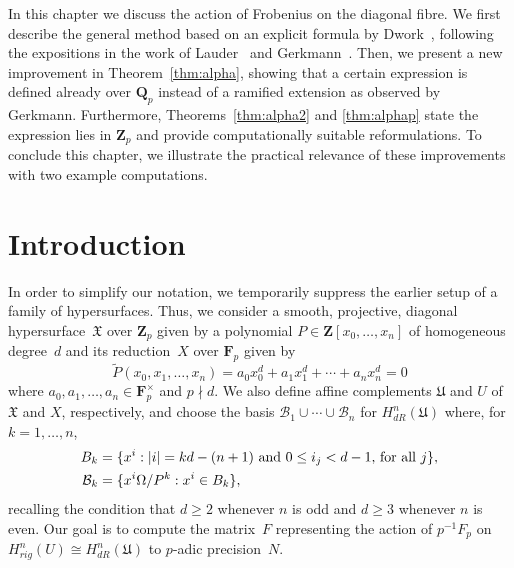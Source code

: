 
In this chapter we discuss the action of Frobenius on the diagonal fibre. 
We first describe the general method based on an explicit formula by 
Dwork~\citep[\S 4]{Dwork64}, following the expositions in the work of 
Lauder~\citep[\S 6]{Lau04} and Gerkmann~\citep[\S 4.4]{Gerkmann2007}.  Then, 
we present a new improvement in Theorem~\ref{thm:alpha}, showing that a 
certain expression is defined already over $\mathbf{Q}_p$ instead of a ramified
extension as observed by Gerkmann.  Furthermore, Theorems~\ref{thm:alpha2} 
and \ref{thm:alphap} state the expression lies in $\mathbf{Z}_p$ and 
provide computationally suitable reformulations.  To conclude this chapter, 
we illustrate the practical relevance of these improvements with two example 
computations.


\section{Introduction}

In order to simplify our notation, we temporarily suppress the earlier 
setup of a family of hypersurfaces.
Thus, we consider a smooth, projective, diagonal hypersurface~$\mathfrak{X}$ 
over $\mathbf{Z}_p$ given by a polynomial $P \in \mathbf{Z}[x_0, \dotsc, x_n]$ 
of homogeneous degree~$d$ and its reduction~$X$ over $\mathbf{F}_p$ given by 
\begin{equation*}
\tilde{P}(x_0, x_1, \dotsc, x_n) = 
    a_0 x_0^d + a_1 x_1^d + \dotsb + a_n x_n^d = 0
\end{equation*}
where $a_0, a_1, \dotsc, a_n \in \mathbf{F}_p^{\times}$ and $p \nmid d$.  
We also define affine complements $\mathfrak{U}$ and $U$ of $\mathfrak{X}$ 
and $X$, respectively, and choose the basis 
$\mathcal{B}_1 \cup \dotsb \cup \mathcal{B}_n$ for $H_{dR}^n(\mathfrak{U})$ 
where, for $k = 1, \dotsc, n$, 
\begin{align*}
B_k & = \{ x^i : \text{$\lvert i\rvert = kd - (n+1)$ and $0 \leq i_j < d-1$, for all $j$} \}, \\
\mathcal{B}_k & = \{x^i \Omega / P^k : x^i \in B_k \}, 
\end{align*}
recalling the condition that $d \geq 2$ whenever $n$ is odd and $d \geq 3$ 
whenever $n$ is even.  Our goal is to compute the matrix~$F$ representing 
the action of $p^{-1} F_p$ on $H_{rig}^n(U) \cong H_{dR}^n(\mathfrak{U})$ 
to $p$-adic precision~$N$.

